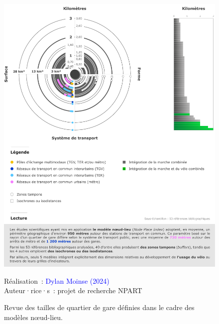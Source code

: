 \begin{refsegment}
    \begin{figure}[h!]\vspace*{4pt}
        \caption{Revue des tailles de quartier de gare définies dans le cadre des modèles nœud-lieu.}
        \label{fig-chap6:revue-tailles-aires}
        \centerline{\includegraphics[width=1\columnwidth]{src/Figures/Chap-6/FR_NPART_Distances_quartiers_gare.pdf}}
        \vspace{5pt}
        \begin{flushright}\scriptsize{
        Réalisation~: \textcolor{blue}{Dylan Moinse (2024)}
        \\
        Auteur·rice·s~: projet de recherche \acrshort{NPART}
        }\end{flushright}
    \end{figure}


\end{refsegment}
